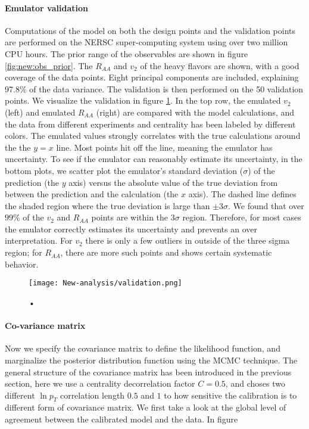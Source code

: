 \paragraph{Emulator validation} Computations of the model on both the design points and the validation points are performed on the NERSC super-computing system using over two million CPU hours.
The prior range of the observables are shown in figure \ref{fig:new:obs_prior}.
The $R_{AA}$ and $v_2$ of the heavy flavors are shown, with a good coverage of the data points.
Eight principal components are included, explaining 97.8\% of the data variance.
The validation is then performed on the 50 validation points.
We visualize the validation in figure \ref{fig:new:validation}.
In the top row, the emulated $v_2$ (left) and emulated $R_{AA}$ (right) are compared with the model calculations, and the data from different experiments and centrality has been labeled by different colors.
The emulated values strongly correlates with the true calculations around the the $y=x$ line.
Most points hit off the line, meaning the emulator has uncertainty.
To see if the emulator can reasonably estimate its uncertainty, in the bottom plots, we scatter plot the emulator's standard deviation ($\sigma$) of the prediction (the $y$ axis) versus the absolute value of the true deviation from between the prediction and the calculation (the $x$ axis).
The dashed line defines the shaded region where the true deviation is large than $\pm 3\sigma$.
We found that over $99\%$ of the $v_2$ and $R_{AA}$ points are within the $3\sigma$ region.
Therefore, for most cases the emulator correctly estimates its uncertainty and prevents an over interpretation.
For $v_2$ there is only a few outliers in outside of the three sigma region; for $R_{AA}$, there are more such points and shows certain systematic behavior.

\begin{figure}
\centering
\texttt{[image: New-analysis/validation.png]}
\caption{•}
\label{fig:new:validation}
\end{figure}

\paragraph{Co-variance matrix} Now we specify the covariance matrix to define the likelihood function, and marginalize the posterior distribution function using the MCMC technique.
The general structure of the covariance matrix has been introduced in the previous section, here we use a centrality decorrelation factor $C=0.5$, and choses two different $\ln p_T$ correlation length $0.5$ and $1$ to how sensitive the calibration is to different form of covariance matrix.
We first take a look at the global level of agreement between the calibrated model and the data.
In figure 

